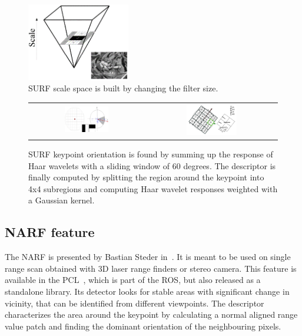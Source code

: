 \begin{figure}[H]
\centering
\includegraphics[width=0.4\textwidth]{figures/surf_scale}
\caption{SURF scale space is built by changing the filter size.}
\label{fig:surf_scale}
\end{figure}

\begin{figure}[H]
\centering
 \begin{tabular}{cc}
 \includegraphics[width=0.4\textwidth]{figures/surf_orientation} &
 \includegraphics[width=0.4\textwidth]{figures/surf_descriptor}
\end{tabular}
\caption{SURF keypoint orientation is found by summing up the response of Haar wavelets with a sliding window of 60 degrees. The descriptor is finally computed by splitting the region around the keypoint into 4x4 subregions and computing Haar wavelet responses weighted with a Gaussian kernel.}
\label{fig:surf_descriptor}
\end{figure}

\clearpage
\subsection{NARF feature}

The \gls{NARF} is presented by Bastian Steder in~\cite{steder10irosws}. It is meant to be used on single range scan obtained with 3D laser range finders or stereo camera. This feature is available in the \gls{PCL}~\cite{Rusu_ICRA2011_PCL}, which is part of the \gls{ROS}, but also released as a standalone library. Its detector looks for stable areas with significant change in vicinity, that can be identified from different viewpoints. The descriptor characterizes the area around the keypoint by calculating a normal aligned range value patch and finding the dominant orientation of the neighbouring pixels.

